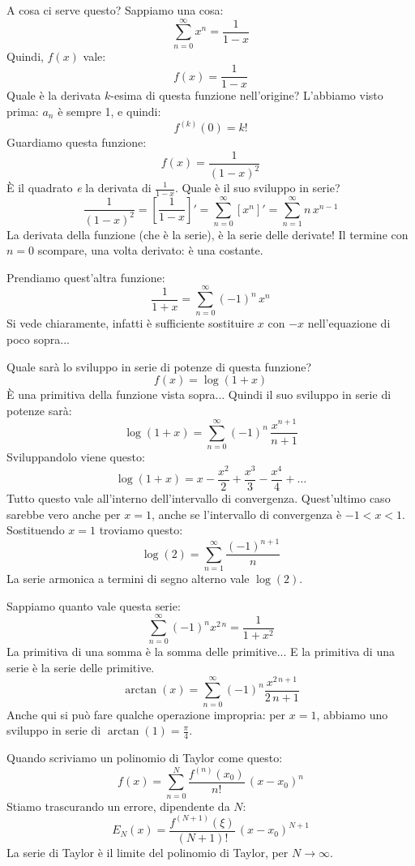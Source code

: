 A cosa ci serve questo? Sappiamo una cosa:
\[
\sum_{n = 0}^{\infty} x^n = \frac{1}{1 - x}
\]
Quindi, $f(x)$ vale:
\[
f(x) = \frac{1}{1 - x}
\]
Quale \`e la derivata $k$-esima di questa funzione nell'origine? L'abbiamo visto prima: $a_n$ \`e sempre 1, e quindi:
\[
f^{(k)} (0) = k!
\]
Guardiamo questa funzione:
\[
f(x) = \frac{1}{(1 - x)^2}
\]
\`E il quadrato \emph{e} la derivata di $\frac{1}{1 - x}$. Quale \`e il suo sviluppo in serie?
\[
\frac{1}{(1 - x)^2} = \left[ \frac{1}{1 - x} \right]' = 
\sum_{n = 0}^{\infty} \left[ x^{n} \right]' = \sum_{n = 1}^{\infty} n \, x^{n - 1}
\]
La derivata della funzione (che \`e la serie), \`e la serie delle derivate! Il termine con $n = 0$ scompare, una volta derivato: \`e una costante.

Prendiamo quest'altra funzione:
\[
\frac{1}{1 + x} = \sum_{n = 0}^{\infty} (-1)^n \, x^n
\]
Si vede chiaramente, infatti \`e sufficiente sostituire $x$ con $-x$ nell'equazione di poco sopra...

Quale sar\`a lo sviluppo in serie di potenze di questa funzione?
\[
f(x) = \log (1 + x)
\]
\`E una primitiva della funzione vista sopra... Quindi il suo sviluppo in serie di potenze sar\`a:
\[
\log (1 + x) = \sum_{n = 0}^{\infty} (-1)^n \, \frac{x^{n+1}}{n+1}
\]
Sviluppandolo viene questo:
\[
\log (1 + x) = x - \frac{x^2}{2} + \frac{x^3}{3} - \frac{x^4}{4} + \ldots
\]
Tutto questo vale all'interno dell'intervallo di convergenza. Quest'ultimo caso sarebbe vero anche per $x = 1$, anche se l'intervallo di convergenza \`e $-1 < x < 1$. Sostituendo $x = 1$ troviamo questo:
\[
\log (2) = \sum_{n = 1}^{\infty} \frac{(-1)^{n+1}}{n}
\]
La serie armonica a termini di segno alterno vale $\log (2)$.

Sappiamo quanto vale questa serie:
\[
\sum_{n = 0}^{\infty} (-1)^n x^{2 \, n} = \frac{1}{1 + x^2}
\]
La primitiva di una somma \`e la somma delle primitive... E la primitiva di una serie \`e la serie delle primitive.
\[
\arctan (x) = \sum_{n = 0}^{\infty} (-1)^n \frac{x^{2 \, n + 1}}{2 \, n + 1}
\]
Anche qui si pu\`o fare qualche operazione impropria: per $x = 1$, abbiamo uno sviluppo in serie di $\arctan (1) = \frac{\pi}{4}$.

Quando scriviamo un polinomio di Taylor come questo:
\[
f(x) = \sum_{n = 0}^{N} \frac{f^{(n)} (x_0)}{n!} \, (x - x_0)^n
\]
Stiamo trascurando un errore, dipendente da $N$:
\[
E_N (x) = \frac{f^{(N + 1)} (\xi)}{(N + 1)!} \, (x - x_0)^{N + 1}
\]
La serie di Taylor \`e il limite del polinomio di Taylor, per $N \to \infty$.

